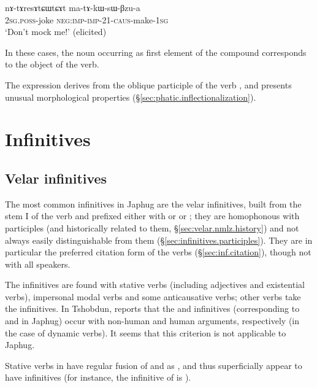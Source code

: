 \begin{exe}
\ex \label{ex:nAtAresAtCWtCAt}
\gll nɤ-tɤresɤtɕɯtɕɤt ma-tɤ-kɯ-sɯ-βzu-a  \\
\textsc{2sg}.\textsc{poss}-joke \textsc{neg}:\textsc{imp}-\textsc{imp}-2\fl{}1-\textsc{caus}-make-\textsc{1sg} \\
\glt `Don't mock me!' (elicited)
\end{exe}

In these cases, the noun occurring as first element of the compound corresponds to the object of the verb.

The expression  derives from the oblique participle of the verb , and presents unusual morphological properties (§\ref{sec:phatic.inflectionalization}).

 

\section{Infinitives} \label{sec:inf}

 
\subsection{Velar infinitives} \label{sec:velar.inf}
The most common infinitives in Japhug are the velar infinitives, built from the stem I of the verb and prefixed either with  or or ; they are homophonous with participles (and historically related to them, §\ref{sec:velar.nmlz.history}) and not always easily distinguishable from them (§\ref{sec:infinitives.participles}). They are in particular the preferred citation form of the verbs (§\ref{sec:inf.citation}), though not with all speakers.
 
The  infinitives are found with stative verbs (including adjectives and existential verbs), impersonal modal verbs and some anticausative verbs; other verbs take the  infinitives. In Tshobdun, \citet[235]{sun14generic} reports that the  and  infinitives (corresponding to  and  in Japhug) occur with non-human and human arguments, respectively (in the case of dynamic verbs). It seems that this criterion is not applicable to Japhug.

Stative verbs in  have regular fusion of  and  as , and thus superficially appear to have  infinitives (for instance, the infinitive of  is  ).

